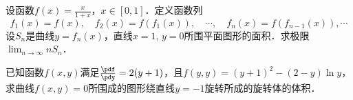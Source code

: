 \documentclass[plain,noanswer,medmath]{../../template/jnuexam}
\begin{document}
\begin{problem}[points=11]
设函数$f(x) = \frac{x}{1 + x}$，$x \in [0,1]$．定义函数列
$$f_1(x) = f(x),\quad f_2(x) = f(f_1(x)),\quad \cdots,\quad f_n(x) = f(f_{n - 1}(x)), \cdots$$
设$S_n$是曲线$y = f_n(x)$，直线$x = 1$, $y = 0$所围平面图形的面积．求极限$\lim_{n \to \infty} nS_n$．
\end{problem}


\begin{problem}[points=11]
已知函数$f(x,y)$满足$\frac{\pdf}{\pdy} = 2(y + 1)$，且$f(y,y) = (y + 1)^2 - (2 - y)\ln y$，
求曲线$f(x,y) = 0$所围成的图形绕直线$y = - 1$旋转所成的旋转体的体积．
\end{problem}




\end{document}
